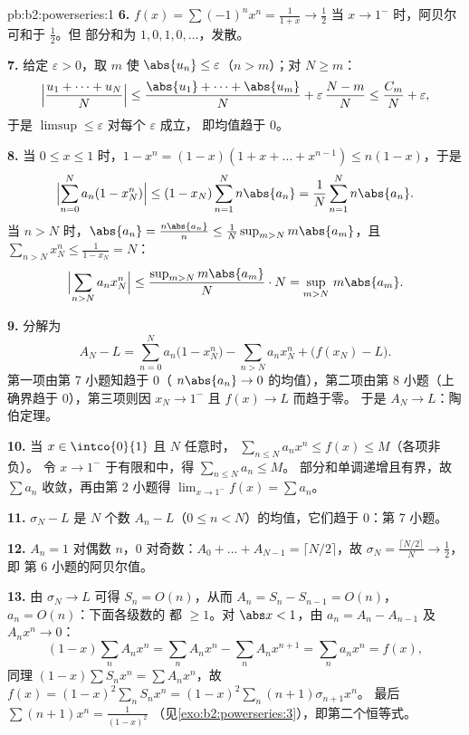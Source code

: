\begin{solution}{pb:b2:powerseries:1}
\textbf{6.} $f(x) = \sum(-1)^nx^n = \frac{1}{1+x} \to \frac12$
当 $x \to 1^-$ 时，阿贝尔可和于 $\frac12$。但
部分和为 $1, 0, 1, 0, \dots$，发散。

\textbf{7.} 给定 $\varepsilon > 0$，取 $m$ 使 $\abs{u_n}
\leq \varepsilon$（$n > m$）；对 $N \geq m$：
\[
\Bigl|\frac{u_1 + \dots + u_N}{N}\Bigr|
\leq \frac{\abs{u_1} + \dots + \abs{u_m}}{N} +
\varepsilon\,\frac{N - m}{N}
\leq \frac{C_m}{N} + \varepsilon,
\]
于是 $\limsup \leq \varepsilon$ 对每个 $\varepsilon$ 成立，
即均值趋于 $0$。

\textbf{8.} 当 $0 \leq x \leq 1$ 时，$1 - x^n = (1-x)(1 + x +
\dots + x^{n-1}) \leq n(1-x)$，于是
\[
\Bigl|\sum_{n=0}^N a_n(1 - x_N^n)\Bigr|
\leq (1 - x_N)\sum_{n=1}^N n\abs{a_n}
= \frac1N\sum_{n=1}^{N}n\abs{a_n} .
\]
当 $n > N$ 时，$\abs{a_n} = \frac{n\abs{a_n}}{n} \leq
\frac{1}{N}\sup_{m>N}m\abs{a_m}$，且 $\sum_{n>N}x_N^n \leq
\frac{1}{1 - x_N} = N$：
\[
\Bigl|\sum_{n>N}a_nx_N^n\Bigr|
\leq \frac{\sup_{m>N}m\abs{a_m}}{N}\cdot N
= \sup_{m>N}\,m\abs{a_m} .
\]

\textbf{9.} 分解为
\[
A_N - L = \sum_{n=0}^{N}a_n\bigl(1 - x_N^n\bigr)
- \sum_{n>N}a_nx_N^n + \bigl(f(x_N) - L\bigr) .
\]
第一项由第 7 小题知趋于 $0$（
$n\abs{a_n} \to 0$ 的均值），第二项由第 8 小题（上确界趋于
$0$），第三项则因 $x_N \to 1^-$ 且 $f(x) \to L$ 而趋于零。
于是 $A_N \to L$：陶伯定理。

\textbf{10.} 当 $x \in \intco{0}{1}$ 且 $N$ 任意时，
$\sum_{n\leq N}a_nx^n \leq f(x) \leq M$（各项非负）。
令 $x \to 1^-$ 于有限和中，得 $\sum_{n\leq N}a_n \leq M$。
部分和单调递增且有界，故 $\sum a_n$
收敛，再由第 2 小题得 $\lim_{x\to1^-}f(x) =
\sum a_n$。

\textbf{11.} $\sigma_N - L$ 是 $N$ 个数
$A_n - L$（$0 \leq n < N$）的均值，它们趋于 $0$：第 7 小题。

\textbf{12.} $A_n = 1$ 对偶数 $n$，$0$ 对奇数：$A_0 + \dots
+ A_{N-1} = \lceil N/2\rceil$，故 $\sigma_N =
\frac{\lceil N/2\rceil}{N} \to \frac12$，即
第 6 小题的阿贝尔值。

\textbf{13.} 由 $\sigma_N \to L$ 可得 $S_n = O(n)$，从而
$A_n = S_n - S_{n-1} = O(n)$，$a_n = O(n)$：下面各级数的
都 $\geq 1$。对 $\abs x < 1$，由 $a_n = A_n -
A_{n-1}$ 及 $A_nx^n \to 0$：
\[
(1-x)\sum_n A_nx^n = \sum_n A_nx^n - \sum_n A_nx^{n+1}
= \sum_n a_nx^n = f(x),
\]
同理 $(1-x)\sum S_nx^n = \sum A_nx^n$，故 $f(x) =
(1-x)^2\sum_n S_nx^n = (1-x)^2\sum_n(n+1)\sigma_{n+1}x^n$。
最后 $\sum(n+1)x^n = \frac{1}{(1-x)^2}$
（见\cref{exo:b2:powerseries:3}），即第二个恒等式。


\end{solution}

